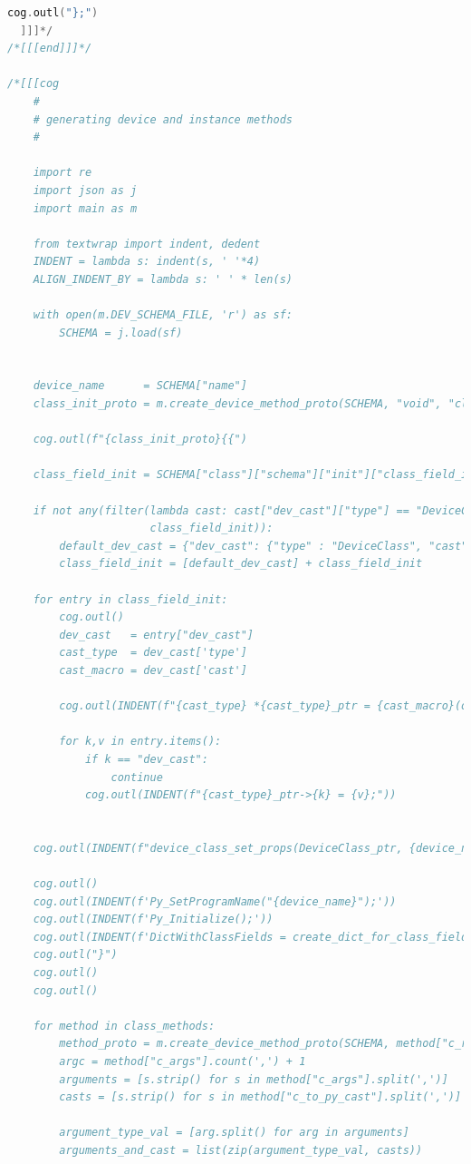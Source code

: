 \begin{lstlisting}[language={C},basicstyle=\tiny,stepnumber=1,caption={Шаблон устройства},label={lst:core.template.c}]
            cog.outl("};")
  ]]]*/
/*[[[end]]]*/

/*[[[cog
    #
    # generating device and instance methods
    #

    import re
    import json as j
    import main as m

    from textwrap import indent, dedent
    INDENT = lambda s: indent(s, ' '*4)
    ALIGN_INDENT_BY = lambda s: ' ' * len(s)

    with open(m.DEV_SCHEMA_FILE, 'r') as sf:
        SCHEMA = j.load(sf)


    device_name      = SCHEMA["name"]
    class_init_proto = m.create_device_method_proto(SCHEMA, "void", "class_init", "ObjectClass *oc, void *data")

    cog.outl(f"{class_init_proto}{{")

    class_field_init = SCHEMA["class"]["schema"]["init"]["class_field_init"]

    if not any(filter(lambda cast: cast["dev_cast"]["type"] == "DeviceClass",
                      class_field_init)):
        default_dev_cast = {"dev_cast": {"type" : "DeviceClass", "cast": "DEVICE_CLASS"}}
        class_field_init = [default_dev_cast] + class_field_init

    for entry in class_field_init:
        cog.outl()
        dev_cast   = entry["dev_cast"]
        cast_type  = dev_cast['type']
        cast_macro = dev_cast['cast']

        cog.outl(INDENT(f"{cast_type} *{cast_type}_ptr = {cast_macro}(oc);"))

        for k,v in entry.items():
            if k == "dev_cast":
                continue
            cog.outl(INDENT(f"{cast_type}_ptr->{k} = {v};"))


    cog.outl(INDENT(f"device_class_set_props(DeviceClass_ptr, {device_name}_properties);"))

    cog.outl()
    cog.outl(INDENT(f'Py_SetProgramName("{device_name}");'))
    cog.outl(INDENT(f'Py_Initialize();'))
    cog.outl(INDENT(f'DictWithClassFields = create_dict_for_class_fields();'))
    cog.outl("}")
    cog.outl()
    cog.outl()

    for method in class_methods:
        method_proto = m.create_device_method_proto(SCHEMA, method["c_ret"], method["c_name"], method["c_args"])
        argc = method["c_args"].count(',') + 1
        arguments = [s.strip() for s in method["c_args"].split(',')]
        casts = [s.strip() for s in method["c_to_py_cast"].split(',')]

        argument_type_val = [arg.split() for arg in arguments]
        arguments_and_cast = list(zip(argument_type_val, casts))


\end{lstlisting}
